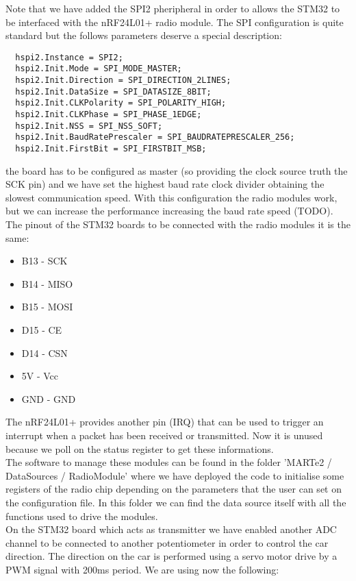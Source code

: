 Note that we have added the SPI2 pheripheral in order to allows the STM32 to be interfaced with the nRF24L01+ radio module. The SPI configuration is quite standard but the follows parameters deserve a special description:
\begin{lstlisting}
  hspi2.Instance = SPI2;
  hspi2.Init.Mode = SPI_MODE_MASTER;
  hspi2.Init.Direction = SPI_DIRECTION_2LINES;
  hspi2.Init.DataSize = SPI_DATASIZE_8BIT;
  hspi2.Init.CLKPolarity = SPI_POLARITY_HIGH;
  hspi2.Init.CLKPhase = SPI_PHASE_1EDGE;
  hspi2.Init.NSS = SPI_NSS_SOFT;
  hspi2.Init.BaudRatePrescaler = SPI_BAUDRATEPRESCALER_256;
  hspi2.Init.FirstBit = SPI_FIRSTBIT_MSB;
\end{lstlisting}
the board has to be configured as master (so providing the clock source truth the SCK pin) and we have set the highest baud rate clock divider obtaining the slowest communication speed. With this configuration the radio modules work, but we can increase the performance increasing the baud rate speed (TODO).\\
The pinout of the STM32 boards to be connected with the radio modules it is the same:
\begin{itemize}
\item B13 - SCK
\item B14 - MISO
\item B15 - MOSI
\item D15 - CE
\item D14 - CSN
\item 5V  - Vcc
\item GND - GND
\end{itemize}  
The nRF24L01+ provides another pin (IRQ) that can be used to trigger an interrupt when a packet has been received or transmitted. Now it is unused because we poll on the status register to get these informations.\\
The software to manage these modules can be found in the folder 'MARTe2 / DataSources / RadioModule' where we have deployed the code to initialise some registers of the radio chip depending on the parameters that the user can set on the configuration file. In this folder we can find the data source itself with all the functions used to drive the modules.\\
On the STM32 board which acts as transmitter we have enabled another ADC channel to be connected to another potentiometer in order to control the car direction. The direction on the car is performed using a servo motor drive by a PWM signal with 200ms period. We are using now the following:
